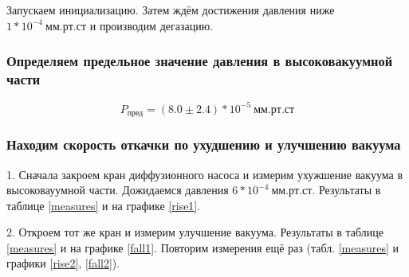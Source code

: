 \documentclass[a4paper, 12pt]{article}
\begin{document}
            Запускаем инициализацию. Затем ждём достижения давления ниже $ 1*10^{-4}~мм.рт.ст$ и производим дегазацию.

        \subsubsection{Определяем предельное значение давления в высоковакуумной части}

            $$ P_{пред} = (8.0 \pm 2.4)*10^{-5}~мм.рт.ст $$

        \subsubsection{Находим скорость откачки по ухудшению и улучшению вакуума}

            1. Сначала закроем кран диффузионного насоса и измерим ухужшение вакуума в высоковауумной части. Дожидаемся давления $6*10^{-4}~мм.рт.ст$. Результаты в таблице \ref{measures} и на графике \ref{rise1}.

            2. Откроем тот же кран и измерим улучшение вакуума. Результаты в таблице \ref{measures} и на графике \ref{fall1}. Повторим измерения ещё раз (табл. \ref{measures} и графики \ref{rise2}, \ref{fall2}).
\end{document}

